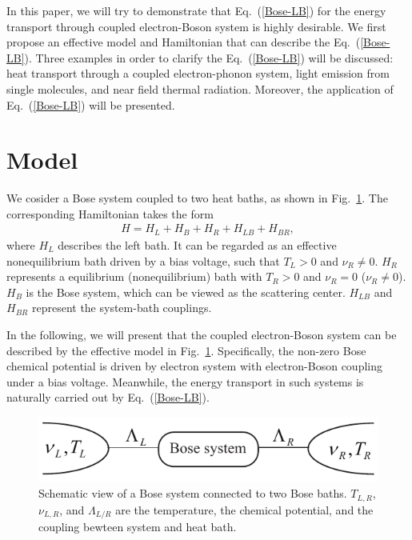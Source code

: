 \documentclass[aps
,twocolumn
,floatfix,footinbib,prl,longbibliography
]{revtex4-1}
\begin{document}
In this paper, we will try to demonstrate that Eq.~(\ref{Bose-LB}) for the energy transport through coupled electron-Boson system is highly desirable. We first propose an effective model and Hamiltonian that can describe the Eq.~(\ref{Bose-LB}). Three examples in order to clarify the Eq.~(\ref{Bose-LB}) will be discussed: heat transport through a coupled electron-phonon system, light emission from single molecules, and near field thermal radiation.
Moreover, the application of Eq.~(\ref{Bose-LB}) will be presented.

\section{Model}
We cosider a Bose system coupled to two heat baths, as shown in Fig.~\ref{Fig01}. The corresponding Hamiltonian takes the form
\begin{equation}
\begin{split}
H=H_{L}+H_{B}+H_{R}+H_{LB}+H_{BR},
\end{split}
\label{hamiltonian}
\end{equation}
where $H_{L}$ describes the left bath. It can be regarded as an effective nonequilibrium bath driven by a bias voltage, such that $T_{L}>0$ and $\nu_{R}\neq0$. $H_{R}$ represents a equilibrium (nonequilibrium) bath with $T_{R}>0$ and $\nu_{R}=0$ ($\nu_{R}\neq0$). $H_{B}$ is the Bose system, which can be viewed as the scattering center. $H_{LB}$ and $H_{BR}$ represent the system-bath couplings.

In the following, we will present that the coupled electron-Boson system can be described by the effective model in Fig.~\ref{Fig01}. Specifically, the non-zero Bose chemical potential is driven by electron system with electron-Boson coupling under a bias voltage. Meanwhile, the energy transport in such systems is naturally carried out by Eq.~(\ref{Bose-LB}).
%
\begin{figure}[h]
\centering
\includegraphics[width=8 cm]{photon-Landauer.pdf}
\caption{ Schematic view of a Bose system connected to two Bose baths. $T_{L,R}$, $\nu_{L,R}$, and $\Lambda_{L/R}$ are the temperature, the chemical potential, and the coupling bewteen system and heat bath.}
\label{Fig01}
\end{figure}
%
\end{document}
